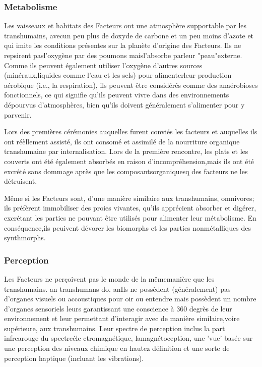 \subsubsection{Metabolisme } 

Les vaisseaux et habitats des Facteurs ont une atmosphère supportable par les transhumains, avecun peu plus de doxyde de carbone et un peu moins d'azote et qui imite les conditions présentes sur la planète d'origine des Facteurs. Ils ne repsirent pasl'oxygène par des poumons maisl'absorbe parleur "peau"externe. Comme ils peuvent également utiliser l'oxygène d'autres sources (minéraux,liquides comme l'eau et les sels)  pour alimenterleur production aérobique (i.e., la respiration), ils peuvent être considérés comme des anaérobioses fonctionnels, ce qui signifie qu'ils peuvent vivre dans des environnements dépourvus d'atmosphères, bien qu'ils doivent généralement s'alimenter pour y parvenir. 

Lors des premières cérémonies auquelles furent conviés les facteurs et auquelles ils ont réèllement assisté, ils ont consomé et assimilé de la nourriture organique transhumaine par internalisation. Lors de la première rencontre, les plats et les couverts ont été également absorbés en raison d'incompréhension,mais ils ont été excrété sans dommage après que les composantsorganiquesq des facteurs ne les détruisent. 

Même si les Facteurs sont, d'une manière similaire aux transhumains, omnivores; ils préfèrent immobiliser des proies vivantes, qu'ils apprécient absorber et digérer, excrétant les parties ne pouvant être utilisés pour alimenter leur métabolisme. En conséquence,ils peuivent dévorer les biomorphs et les parties nonmétalliques des synthmorphs. 

\subsubsection{Perception } 

Les Facteurs ne perçoivent pas le monde de la mêmemanière que les transhumains. an transhumans do.
anIls ne possèdent (généralement) pas d'organes visuels ou accoustiques pour oir ou entendre mais possèdent un nombre d'organes sensoriels leurs garantissant une conscience à 360 degrès de leur environnement et leur permettant d'interagir avec de manière similaire,voire supérieure, aux transhumains. Leur spectre de perception inclus la part infrearouge du spectreéle ctromagnétique, lamagnétoception, une 'vue' basée sur une perception des niveaux chimique en hautez définition et une sorte de perception haptique (incluant les vibrations). 

